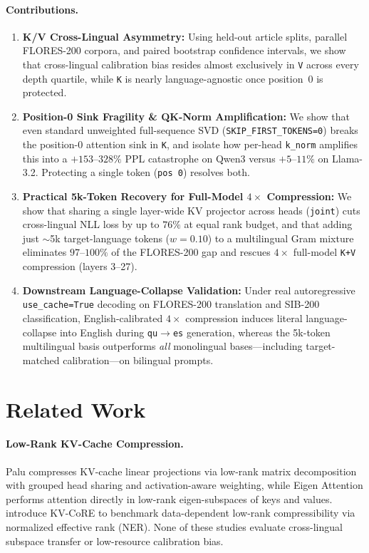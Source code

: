 \documentclass[11pt,a4paper,twocolumn]{article}
\begin{document}
\paragraph{Contributions.}
\begin{enumerate}
  \item \textbf{K/V Cross-Lingual Asymmetry:} Using held-out article splits, parallel FLORES-200 corpora, and paired bootstrap confidence intervals, we show that cross-lingual calibration bias resides almost exclusively in \texttt{V} across every depth quartile, while \texttt{K} is nearly language-agnostic once position~0 is protected.
  \item \textbf{Position-0 Sink Fragility \& QK-Norm Amplification:} We show that even standard unweighted full-sequence SVD (\texttt{SKIP\_FIRST\_TOKENS=0}) breaks the position-0 attention sink in \texttt{K}, and isolate how per-head \texttt{k\_norm} amplifies this into a $+153$--$328\%$ PPL catastrophe on Qwen3 versus $+5$--$11\%$ on Llama-3.2. Protecting a single token (\texttt{pos 0}) resolves both.
  \item \textbf{Practical 5k-Token Recovery for Full-Model $4\times$ Compression:} We show that sharing a single layer-wide KV projector across heads (\texttt{joint}) cuts cross-lingual NLL loss by up to $76\%$ at equal rank budget, and that adding just $\sim$5k target-language tokens ($w=0.10$) to a multilingual Gram mixture eliminates $97$--$100\%$ of the FLORES-200 gap and rescues $4\times$ full-model \texttt{K+V} compression (layers 3--27).
  \item \textbf{Downstream Language-Collapse Validation:} Under real autoregressive \texttt{use\_cache=True} decoding on FLORES-200 translation and SIB-200 classification, English-calibrated $4\times$ compression induces literal language-collapse into English during \texttt{qu}$\rightarrow$\texttt{es} generation, whereas the 5k-token multilingual basis outperforms \emph{all} monolingual bases---including target-matched calibration---on bilingual prompts.
\end{enumerate}

\section{Related Work}
\paragraph{Low-Rank KV-Cache Compression.}
Palu \citep{chang2025palu} compresses KV-cache linear projections via low-rank matrix decomposition with grouped head sharing and activation-aware weighting, while Eigen Attention \citep{saxena2024eigen} performs attention directly in low-rank eigen-subspaces of keys and values. \citet{chen2026kvcore} introduce KV-CoRE to benchmark data-dependent low-rank compressibility via normalized effective rank (NER). None of these studies evaluate cross-lingual subspace transfer or low-resource calibration bias.
\end{document}
